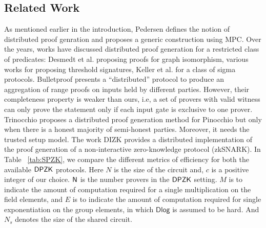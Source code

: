 \subsection{Related Work}\label{sec:relatedwork}
As mentioned earlier in the introduction, Pedersen \cite{Ped92} defines the
notion of distributed proof genration and proposes a generic construction using
MPC. Over the years, works have discussed distributed proof generation for a
restricted class of predicates: Desmedt et al. \cite{DDB94} proposing proofs for
graph isomorphism, various works \cite{King05, DDS, Desmedt2011} for proposing
threshold signatures, Keller et al. \cite{EfficientTZ} for a class of sigma
protocols. Bulletproof  \cite{bulletproofs} presents a
``distributed'' protocol to produce an aggregation of range proofs on inputs
held by different parties. However, their completeness property is weaker than
ours, i.e, a set of provers with valid witness can only prove the statement only if each input gate is exclusive to one prover. 
Trinocchio \cite{trinocchio} proposes a distributed proof generation method for
 Pinocchio  \cite{pinnochio_PHGR} but only when there is a
honest majority of semi-honest parties. Moreover, it needs the trusted setup
model. The work DIZK \cite{dizk} provides a distributed implementation of the proof generation of a non-interactive zero-knowledge protocol (zkSNARK).
 In Table ~\ref{tab:SPZK}, we compare the different metrics of efficiency for both the available $\mathsf{DPZK}$ protocols. Here $N$ is the size of the circuit and, $c$ is a positive integer of our choice. $\mathsf{N}$ is the number provers in the $\mathsf{DPZK}$ setting. $M$ is to indicate the amount of computation required for a single multiplication on the field elements, and $E$ is to indicate the amount of computation required for single exponentiation on the group elements, in which $\mathsf{Dlog}$ is assumed to be hard. And $N_s$ denotes the size of the shared circuit.
